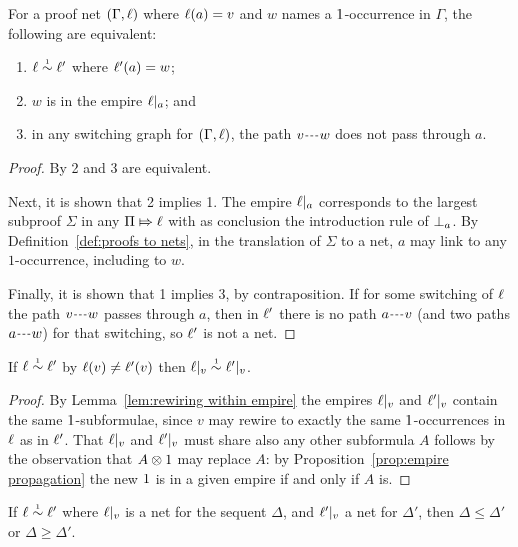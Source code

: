 \documentclass{sigplanconf-modified}
\begin{document}
\begin{lemma}
\label{lem:rewiring within empire}
For a proof net $(\Gamma,\ell)$ where $\ell(a)=v$ and $w$ names a $1$-occurrence in $\Gamma$, the following are equivalent:
%
\begin{enumerate}
	\item
$\links\perm*\links'$ where $\ell'(a)=w$;
	\item
$w$ is in the empire $\emp a$; and
	\item
in any switching graph for $(\Gamma,\ell)$, the path $\path vw$ does not pass through $a$.
\end{enumerate}
\end{lemma}


\begin{proof}
By \cite[Proposition 2.a]{Bellin-vandeWiele-1995} 2 and 3 are equivalent.

Next, it is shown that 2 implies 1.
%
The empire $\emp a$ corresponds to the largest subproof $\Sigma$ in any $\Pi\Mapsto\ell$ with as conclusion the introduction rule of $\bot_{a}$.
%
By Definition~\ref{def:proofs to nets}, in the translation of $\Sigma$ to a net, $a$ may link to any $1$-occurrence, including to $w$.



Finally, it is shown that 1 implies 3, by contraposition.
%
If for some switching of $\ell$ the path $\path vw$ passes through $a$, then in $\ell'$ there is no path $\path av$ (and two paths $\path aw$) for that switching, so $\ell'$ is not a net.
%
\end{proof}


\begin{lemma}
\label{lem:rewiring preserves empire}
If $\links\perm*\links'$ by $\ell(v)\neq\ell'(v)$ then $\emp v\perm*\emp*v$.
\end{lemma}

\begin{proof}
By Lemma~\ref{lem:rewiring within empire} the empires $\emp v$ and $\emp*v$ contain the same $1$-subformulae, since $v$ may rewire to exactly the same $1$-occurrences in $\ell$ as in $\ell'$.
%
That $\emp v$ and $\emp*v$ must share also any other subformula $A$ follows by the observation that $A\otimes1$ may replace $A$: by Proposition~\ref{prop:empire propagation} the new $1$ is in a given empire if and only if $A$ is.
%
\end{proof}


\begin{lemma}
\label{lem:rewiring affects empires}
If $\links\perm*\links'$ where $\emp v$ is a net for the sequent $\Delta$, and $\emp*v$ a net for $\Delta'$, then $\Delta\leq\Delta'$ or $\Delta\geq\Delta'$.
\end{lemma}
\end{document}
